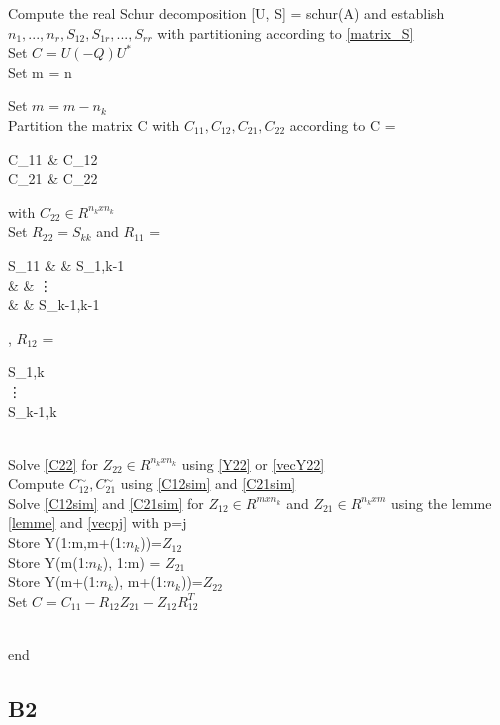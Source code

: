 \documentclass[11pt]{article}
\begin{document}
\begin{algorithm}[H]
Compute the real Schur decomposition [U, S] = schur(A) and establish $n_{1}, ..., n_{r}, S_{12}, S_{1r}, ..., S_{rr}$ with partitioning according to \ref{matrix_S}\\
Set $C = U (-Q) U^{*}$ \\
Set m = n \\
{Set $m = m - n_{k}$ \\
Partition the matrix C with $C_{11}, C_{12}, C_{21}, C_{22}$ according to C = \begin{pmatrix}
C_{11} & C_{12} \\ C_{21} & C_{22} \end{pmatrix} with $C_{22} \in R^{n_{k}xn_{k}}$ \\
Set $R_{22} = S_{kk}$ and $R_{11}$ = \begin{pmatrix} S_{11} & \hdots & S_{1,k-1} \\ & \ddots & \vdots \\ & & S_{k-1,k-1} \end{pmatrix}, $R_{12}$ = \begin{pmatrix} S_{1,k} \\ \vdots \\ S_{k-1,k} \end{pmatrix} \\
Solve \ref{C22} for $Z_{22} \in R^{n_{k}xn_{k}}$ using \ref{Y22} or \ref{vecY22} \\
Compute $C_{12}^{\sim}, C_{21}^{\sim}$ using \ref{C12sim} and \ref{C21sim} \\
Solve \ref{C12sim} and \ref{C21sim} for $Z_{12} \in R^{mxn_{k}}$ and $Z_{21} \in R^{n_{k}xm}$ using the lemme \ref{lemme} and \ref{vecpj} with p=j \\
Store Y(1:m,m+(1:$n_{k}$))=$Z_{12}$ \\
Store Y(m(1:$n_{k}$), 1:m) = $Z_{21}$ \\
Store Y(m+(1:$n_{k}$), m+(1:$n_{k}$))=$Z_{22}$ \\
Set $C = C_{11} - R_{12} Z_{21} - Z_{12} R_{12}^{T}$} \\
end
\caption{ }
\end{algorithm}


\subsection*{B2}
\end{document}
